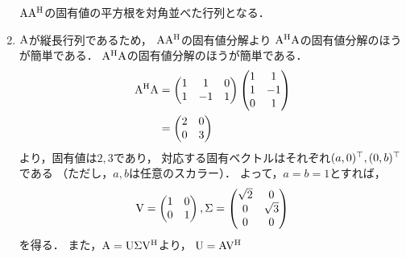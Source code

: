 \begin{enumerate}[label=(\roman*)]
        $\mathrm{A}\mathrm{A}^\mathrm{H}$の固有値の平方根を対角並べた行列となる．
      \item $\mathrm{A}$が縦長行列であるため，
        $\mathrm{A}\mathrm{A}^\mathrm{H}$の固有値分解より
        $\mathrm{A}^\mathrm{H}\mathrm{A}$の固有値分解のほうが簡単である．
        $\mathrm{A}^\mathrm{H}\mathrm{A}$の固有値分解のほうが簡単である．
        \begin{align}
          \mathrm{A}^\mathrm{H}\mathrm{A}
            &= 
              \begin{pmatrix}
                1 & 1 & 0 \\
                1 & -1 & 1
              \end{pmatrix}
              \begin{pmatrix}
                1 & 1 \\
                1 & -1 \\
                0 & 1
              \end{pmatrix} \\
            &=
              \begin{pmatrix}
                2 & 0 \\
                0 & 3 
              \end{pmatrix}
        \end{align}
        より，固有値は$2, 3$であり，
        対応する固有ベクトルはそれぞれ$(a, 0)^\top, (0, b)^\top$である
        （ただし，$a, b$は任意のスカラー）．
        よって，$a = b = 1$とすれば，
        \begin{equation}
          \mathrm{V} = 
          \begin{pmatrix}
            1 & 0 \\
            0 & 1 
          \end{pmatrix},
          \mathrm{\Sigma} =
          \begin{pmatrix}
            \sqrt{2} & 0 \\
            0 & \sqrt{3} \\
            0 & 0
          \end{pmatrix}
        \end{equation}
        を得る．
        また，$\mathrm{A} = \mathrm{U}\mathrm{\Sigma}\mathrm{V}^\mathrm{H}$より，
        $\mathrm{U} = \mathrm{A}\mathrm{V}^\mathrm{H}$

    \end{enumerate}

  \clearpage
